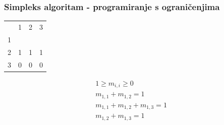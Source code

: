 \documentclass{beamer}
\begin{document}
    \begin{frame}[t]
        \frametitle{Simpleks algoritam - programiranje s ograničenjima}

        \begin{table}[ht]
            \centering
            \begin{tabular}{llll}
                                   & 1                      & 2                      & 3                      \\ \cline{2-4}
            \multicolumn{1}{l|}{1} & \multicolumn{1}{l|}{}  & \multicolumn{1}{l|}{}  & \multicolumn{1}{l|}{}  \\ \cline{2-4}
            \multicolumn{1}{l|}{2} & \multicolumn{1}{l|}{1} & \multicolumn{1}{l|}{1} & \multicolumn{1}{l|}{1} \\ \cline{2-4}
            \multicolumn{1}{l|}{3} & \multicolumn{1}{l|}{0} & \multicolumn{1}{l|}{0} & \multicolumn{1}{l|}{0}  \\ \cline{2-4}
            \end{tabular}
        \end{table}

        \begin{gather*}
            1 \ge m_{i, i} \ge 0 \\
            m_{1, 1} + m_{1, 2} = 1 \\
            m_{1, 1} + m_{1, 2}+ m_{1, 3} = 1 \\
            m_{1, 2} + m_{1, 3} = 1
        \end{gather*}

    \end{frame}
\end{document}
